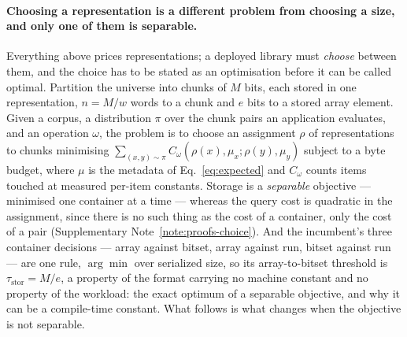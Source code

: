 \paragraph*{Choosing a representation is a different problem from choosing a size, and only one of
them is separable.}
Everything above prices representations; a deployed library must \emph{choose} between them, and the
choice has to be stated as an optimisation before it can be called optimal. Partition the universe into
chunks of $M$ bits, each stored in one representation, $n=M/w$ words to a chunk and $e$ bits to a
stored array element. Given a corpus, a distribution $\pi$ over the chunk pairs an application
evaluates, and an operation $\omega$, the problem is to choose an assignment $\rho$ of representations
to chunks minimising $\sum_{(x,y)\sim\pi} C_\omega(\rho(x),\mu_x;\rho(y),\mu_y)$ subject to a byte
budget, where $\mu$ is the metadata of Eq.~\eqref{eq:expected} and $C_\omega$ counts items touched at
measured per-item constants. Storage is a \emph{separable} objective --- minimised one container at a
time --- whereas the query cost is quadratic in the assignment, since there is no such thing as the
cost of a container, only the cost of a pair (Supplementary Note~\ref{note:proofs-choice}). And the incumbent's three
container decisions --- array against bitset, array against run, bitset against run --- are one rule,
$\arg\min$ over serialized size, so its array-to-bitset threshold is $\tau_{\mathrm{stor}} = M/e$, a
property of the format carrying no machine constant and no property of the workload: the exact optimum
of a separable objective, and why it can be a compile-time constant. What follows is what changes
when the objective is not separable.

